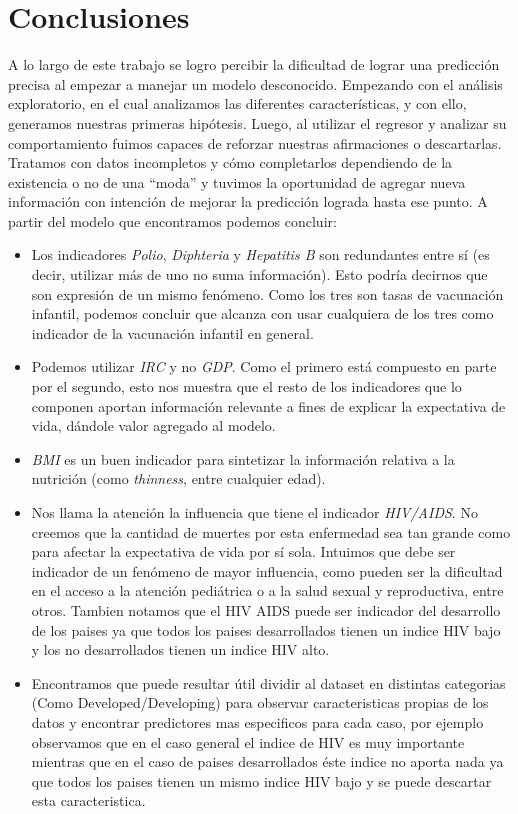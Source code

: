 \section{Conclusiones}\label{sec:conclusiones}
A lo largo de este trabajo se logro percibir la dificultad de lograr una predicción precisa al empezar a manejar un modelo desconocido. Empezando con el análisis exploratorio, en el cual analizamos las diferentes características, y con ello, generamos nuestras primeras hipótesis. Luego, al utilizar el regresor y analizar su comportamiento fuimos capaces de reforzar nuestras afirmaciones o descartarlas. Tratamos con datos incompletos y cómo completarlos dependiendo de la existencia o no de una ``moda'' y tuvimos la oportunidad de agregar nueva información con intención de mejorar la predicción lograda hasta ese punto.
A partir del modelo que encontramos podemos concluir:

\begin{itemize}
    \item Los indicadores \textit{Polio}, \textit{Diphteria} y \textit{Hepatitis B } son redundantes entre sí (es decir, utilizar más de uno no suma información). Esto podría decirnos que son expresión de un mismo fenómeno. Como los tres son tasas de vacunación infantil, podemos concluir que alcanza con usar cualquiera de los tres como indicador de la vacunación infantil en general.
    
    \item Podemos utilizar \textit{IRC} y no \textit{GDP}. Como el primero está compuesto en parte por el segundo, esto nos muestra que el resto de los indicadores que lo componen aportan información relevante a fines de explicar la expectativa de vida, dándole valor agregado al modelo.
    
    \item \textit{BMI} es un buen indicador para sintetizar la información relativa a la nutrición (como \textit{thinness}, entre cualquier edad).
    
    \item Nos llama la atención la influencia que tiene el indicador \textit{HIV/AIDS}. No creemos que la cantidad de muertes por esta enfermedad sea tan grande como para afectar la expectativa de vida por sí sola. Intuimos que debe ser indicador de un fenómeno de mayor influencia, como pueden ser la dificultad en el acceso a la atención pediátrica o a la salud sexual y reproductiva, entre otros. Tambien notamos que el HIV AIDS puede ser indicador del desarrollo de los paises ya que todos los paises desarrollados tienen un indice HIV bajo y los no desarrollados tienen un indice HIV alto.
    
    \item Encontramos que puede resultar útil dividir al dataset en distintas categorias (Como Developed/Developing) para observar caracteristicas propias de los datos y encontrar predictores mas especificos para cada caso, por ejemplo observamos que en el caso general el indice de HIV es muy importante mientras que en el caso de paises desarrollados éste indice no aporta nada ya que todos los paises tienen un mismo indice HIV bajo y se puede descartar esta caracteristica.
\end{itemize}

